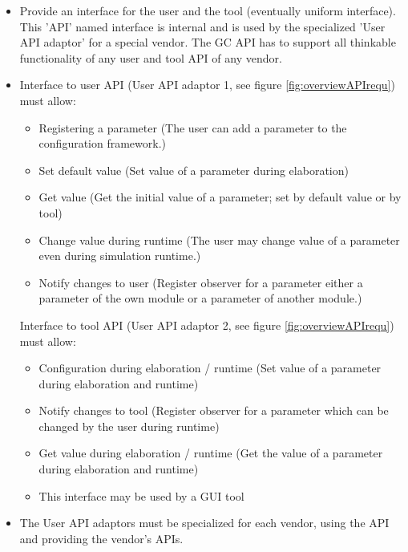 \begin{itemize}
	\item Provide an interface for the user and the tool (eventually uniform interface). This '\GreenConfig API' named interface is \GreenConfig internal and is used by the specialized 'User API adaptor' for a special vendor. The GC API has to support all thinkable functionality of any user and tool API of any vendor. 
	
	\item Interface to user API (\GreenConfig User API adaptor 1, see figure \ref{fig:overviewAPIrequ}) must allow: 
	
	\begin{itemize}
		\item Registering a parameter (The user can add a parameter to the configuration framework.) 
		\item Set default value (Set value of a parameter during elaboration) 
		\item Get value (Get the initial value of a parameter; set by default value or by tool) 
		\item Change value during runtime (The user may change value of a parameter even during simulation runtime.) 
		\item Notify changes to user (Register observer for a parameter either a parameter of the own module or a parameter of another module.) 
	\end{itemize}
	Interface to tool API (\GreenConfig User API adaptor 2, see figure \ref{fig:overviewAPIrequ}) must allow: 
	
	\begin{itemize}
		\item Configuration during elaboration / runtime (Set value of a parameter during elaboration and runtime) 
		\item Notify changes to tool (Register observer for a parameter which can be changed by the user during runtime) 
		\item Get value during elaboration / runtime (Get the value of a parameter during elaboration and runtime) 
		\item This interface may be used by a GUI tool 
	\end{itemize}

	\item The User API adaptors must be specialized for each vendor, using the \GreenConfig API and providing the vendor's APIs. 
\end{itemize}

